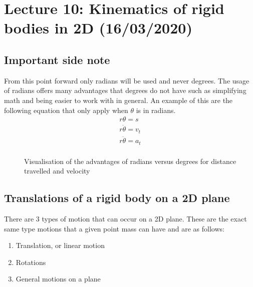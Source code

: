 \documentclass[11pt, a4paper]{article}
\begin{document}
\setcounter{section}{9}
\section{Lecture 10: Kinematics of rigid bodies in 2D (16/03/2020)}
\subsection{Important side note}
From this point forward only radians will be used and never degrees. The usage of radians offers many advantages that degrees do not have such as simplifying math and being easier to work with in general. An example of this are the following equation that only apply when $\theta$ is in radians.
\begin{gather*}
    r\theta = s\\
    r\dot{\theta} = v_t\\
    r\ddot{\theta} = a_t\\
\end{gather*}

\begin{figure}[h]
  \centering
  \qquad \qquad \qquad
  \caption{Visualisation of the advantages of radians versus degrees for distance travelled and velocity}
\end{figure}

\subsection{Translations of a rigid body on a 2D plane}
There are 3 types of motion that can occur on a 2D plane. These are the exact same type motions that a given point mass can have and are as follows:
\begin{enumerate}
    \item Translation, or linear motion
    \item Rotations
    \item General motions on a plane
\end{enumerate}
\end{document}
